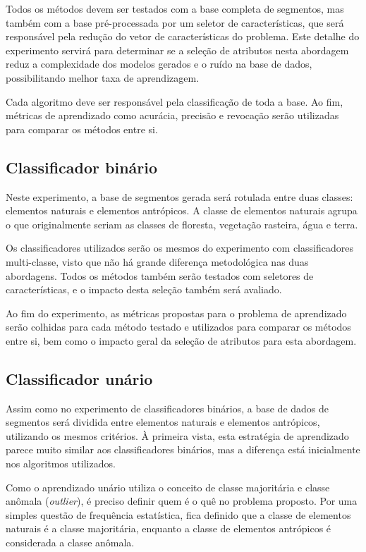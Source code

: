 Todos os métodos devem ser testados com a base completa de segmentos, mas também com a base pré-processada por um seletor de características, que será responsável pela redução do vetor de características do problema. Este detalhe do experimento servirá para determinar se a seleção de atributos nesta abordagem reduz a complexidade dos modelos gerados e o ruído na base de dados, possibilitando melhor taxa de aprendizagem.

Cada algoritmo deve ser responsável pela classificação de toda a base. Ao fim, métricas de aprendizado como acurácia, precisão e revocação serão utilizadas para comparar os métodos entre si.

\subsection{Classificador binário}

Neste experimento, a base de segmentos gerada será rotulada entre duas classes: elementos naturais e elementos antrópicos. A classe de elementos naturais agrupa o que originalmente seriam as classes de floresta, vegetação rasteira, água e terra.

Os classificadores utilizados serão os mesmos do experimento com classificadores multi-classe, visto que não há grande diferença metodológica nas duas abordagens. Todos os métodos também serão testados com seletores de características, e o impacto desta seleção também será avaliado.

Ao fim do experimento, as métricas propostas para o problema de aprendizado serão colhidas para cada método testado e utilizados para comparar os métodos entre si, bem como o impacto geral da seleção de atributos para esta abordagem.

\subsection{Classificador unário}

Assim como no experimento de classificadores binários, a base de dados de segmentos será dividida entre elementos naturais e elementos antrópicos, utilizando os mesmos critérios. À primeira vista, esta estratégia de aprendizado parece muito similar aos classificadores binários, mas a diferença está inicialmente nos algoritmos utilizados.

Como o aprendizado unário utiliza o conceito de classe majoritária e classe anômala (\textit{outlier}), é preciso definir quem é o quê no problema proposto. Por uma simples questão de frequência estatística, fica definido que a classe de elementos naturais é a classe majoritária, enquanto a classe de elementos antrópicos é considerada a classe anômala.

